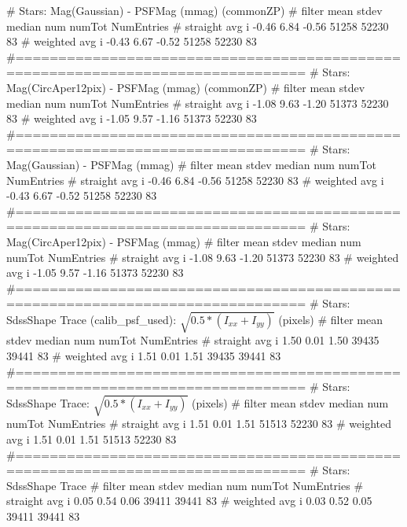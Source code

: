 \begin{code}
# Stars: Mag(Gaussian) - PSFMag (mmag) (commonZP)
#                filter    mean    stdev    median     num      numTot  NumEntries
# straight avg       i    -0.46     6.84    -0.56     51258     52230        83
# weighted avg       i    -0.43     6.67    -0.52     51258     52230        83
#================================================================================
# Stars: Mag(CircAper12pix) - PSFMag (mmag) (commonZP)
#                filter    mean    stdev    median     num      numTot  NumEntries
# straight avg       i    -1.08     9.63    -1.20     51373     52230        83
# weighted avg       i    -1.05     9.57    -1.16     51373     52230        83
#================================================================================
# Stars: Mag(Gaussian) - PSFMag (mmag)
#                filter    mean    stdev    median     num      numTot  NumEntries
# straight avg       i    -0.46     6.84    -0.56     51258     52230        83
# weighted avg       i    -0.43     6.67    -0.52     51258     52230        83
#================================================================================
# Stars: Mag(CircAper12pix) - PSFMag (mmag)
#                filter    mean    stdev    median     num      numTot  NumEntries
# straight avg       i    -1.08     9.63    -1.20     51373     52230        83
# weighted avg       i    -1.05     9.57    -1.16     51373     52230        83
#================================================================================
# Stars:   SdssShape Trace (calib_psf_used): $\sqrt{0.5*(I_{xx}+I_{yy})}$ (pixels)
#                filter    mean    stdev    median     num      numTot  NumEntries
# straight avg       i     1.50     0.01     1.50     39435     39441        83
# weighted avg       i     1.51     0.01     1.51     39435     39441        83
#================================================================================
# Stars:  SdssShape Trace: $\sqrt{0.5*(I_{xx}+I_{yy})}$ (pixels)
#                filter    mean    stdev    median     num      numTot  NumEntries
# straight avg       i     1.51     0.01     1.51     51513     52230        83
# weighted avg       i     1.51     0.01     1.51     51513     52230        83
#================================================================================
# Stars:  SdssShape Trace %
#                filter    mean    stdev    median     num      numTot  NumEntries
# straight avg       i     0.05     0.54     0.06     39411     39441        83
# weighted avg       i     0.03     0.52     0.05     39411     39441        83

\end{code}
